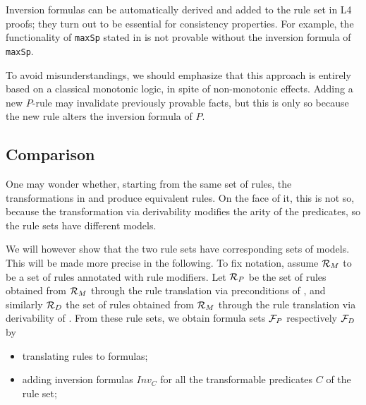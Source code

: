 Inversion formulas can be automatically derived and added to the rule set in
L4 proofs; they turn out to be essential for consistency properties. For
example, the functionality of \texttt{maxSp} stated in 
is not provable without the inversion formula of \texttt{maxSp}.

To avoid misunderstandings, we should emphasize that this approach is entirely
based on a classical monotonic logic, in spite of non-monotonic
effects. Adding a new $P$-rule may invalidate previously provable facts, but
this is only so because the new rule alters the inversion formula of $P$.



\subsection{Comparison}\label{sec:comparison}

One may wonder whether, starting from the same set of rules, the transformations in
 and  produce
equivalent rules. On the face of it, this is not so, because the
transformation via derivability modifies the arity of the predicates, so the
rule sets have different models.

We will however show that the two rule sets have corresponding sets of
models. This will be made more precise in the following. To fix notation,
assume ${\cal R}_M$ to be a set of rules annotated with rule modifiers. Let
${\cal R}_P$ be the set of rules obtained from ${\cal R}_M$ through the rule
translation via preconditions of , and similarly
${\cal R}_D$ the set of rules obtained from ${\cal R}_M$ through the rule
translation via derivability of . From these rule
sets, we obtain formula sets ${\cal F}_P$ respectively ${\cal F}_D$ by
\begin{itemize}
\item translating rules to formulas;
\item adding inversion formulas $Inv_C$ for all
  the transformable predicates $C$ of the rule set;
\end{itemize}



